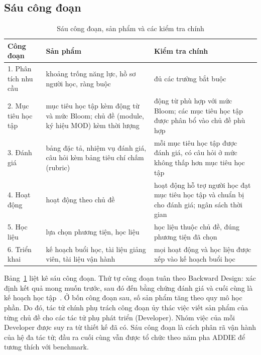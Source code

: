 \documentclass[conference,a4paper]{IEEEtran}
\begin{document}
\subsection{Sáu công đoạn}
\label{sec:stages}

\begin{table}[t]
  \caption{Sáu công đoạn, sản phẩm và các kiểm tra chính}
  \label{tab:stages}
  \centering
  \footnotesize
  \setlength{\tabcolsep}{3pt}
  \begin{tabular}{@{}>{\raggedright}p{1.6cm}>{\raggedright}p{3.05cm}>{\raggedright\arraybackslash}p{3.75cm}@{}}
    \toprule
    Công đoạn & Sản phẩm & Kiểm tra chính \\
    \midrule
    1. Phân tích nhu cầu & khoảng trống năng lực, hồ sơ người học, ràng buộc & đủ các trường bắt buộc \\
    2. Mục tiêu học tập & mục tiêu học tập kèm động từ và mức Bloom; chủ đề (module, ký hiệu MOD) kèm thời lượng & động từ phù hợp với mức Bloom; các mục tiêu học tập được phân bổ vào chủ đề phù hợp \\
    3. Đánh giá & bảng đặc tả, nhiệm vụ đánh giá, câu hỏi kèm bảng tiêu chí chấm (rubric) & mỗi mục tiêu học tập được đánh giá, có câu hỏi ở mức không thấp hơn mục tiêu học tập \\
    4. Hoạt động & hoạt động theo chủ đề & hoạt động hỗ trợ người học đạt mục tiêu học tập và chuẩn bị cho đánh giá; ngân sách thời gian \\
    5. Học liệu & lựa chọn phương tiện, học liệu & học liệu thuộc chủ đề, đúng phương tiện đã chọn \\
    6. Triển khai & kế hoạch buổi học, tài liệu giảng viên, tài liệu vận hành & mọi hoạt động và học liệu được xếp vào kế hoạch buổi học \\
    \bottomrule
  \end{tabular}
\end{table}

Bảng~\ref{tab:stages} liệt kê sáu công đoạn. Thứ tự công đoạn tuân theo Backward Design: xác định kết quả mong muốn trước, sau đó đến bằng chứng đánh giá và cuối
cùng là kế hoạch học tập~\cite{wiggins2005ubd}. Ở bốn công đoạn sau, số sản phẩm
tăng theo quy mô học phần. Do đó, tác tử chính phụ trách công đoạn ủy thác việc viết sản phẩm của từng chủ đề cho các tác tử phụ phát triển (Developer).
Nhóm việc của mỗi Developer được suy ra từ thiết kế đã có. Sáu công đoạn là cách phân rã vận hành của hệ
đa tác tử; đầu ra cuối cùng vẫn được tổ chức theo năm pha ADDIE để tương thích với benchmark.
\end{document}
